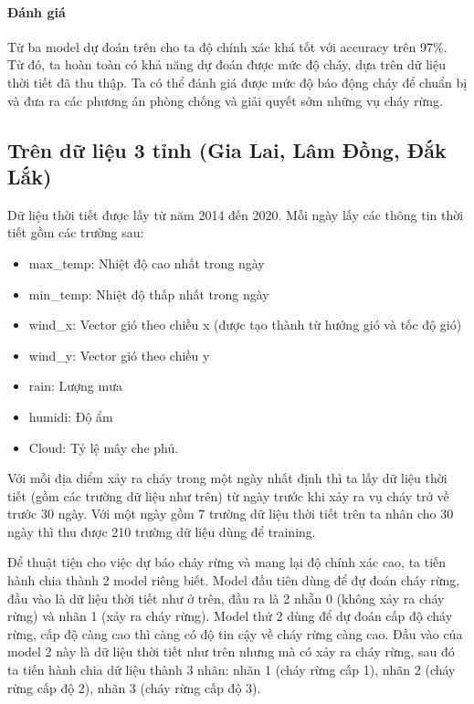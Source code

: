 \documentclass{article}
\begin{document}
\paragraph{Đánh giá}
Từ ba model dự đoán trên cho ta độ chính xác khá tốt với accuracy trên 97\%. Từ đó, ta hoàn toàn có khả năng dự đoán được mức độ cháy, dựa trên dữ liệu thời tiết đã thu thập. Ta có thể  đánh giá được mức độ báo động cháy để chuẩn bị và đưa ra các phương án phòng chống và giải quyết sớm những vụ cháy rừng.

\subsection{Trên dữ liệu 3 tỉnh (Gia Lai, Lâm Đồng, Đắk Lắk)}

Dữ liệu thời tiết được lấy từ năm 2014 đến 2020. Mỗi ngày lấy các thông tin thời tiết gồm các trường sau:

\begin{itemize}
	\item max\_temp: Nhiệt độ cao nhất trong ngày
	\item min\_temp: Nhiệt độ thấp nhất trong ngày
	\item wind\_x: Vector gió theo chiều x (được tạo thành từ hướng gió và tốc độ gió)
	\item wind\_y: Vector gió theo chiều y
	\item rain: Lượng mưa
	\item humidi: Độ ẩm
	\item Cloud: Tỷ lệ mây che phủ.
\end{itemize}

Với mỗi địa diểm xảy ra cháy trong một ngày nhất định thì ta lấy dữ liệu thời tiết (gồm các trường dữ liệu như trên) từ ngày trước khi xảy ra vụ cháy trở về trước 30 ngày. Với một ngày gồm 7 trường dữ liệu thời tiết trên ta nhân cho 30 ngày thì thu được 210 trường dữ liệu dùng để training.

Để thuật tiện cho việc dự báo cháy rừng và mang lại độ chính xác cao, ta tiến hành chia thành 2 model riêng biết. Model đầu tiên dùng để đự đoán cháy rừng, đầu vào là dữ liệu thời tiết như ở trên, đầu ra là 2 nhẵn 0 (không xảy ra cháy rừng) và nhãn 1 (xảy ra cháy rừng). Model thứ 2 dùng để dự đoán cấp độ cháy rừng, cấp độ càng cao thì càng có độ tin cậy về cháy rừng càng cao. Đầu vào của model 2 này là dữ liệu thời tiết như trên nhưng mà có xảy ra cháy rừng, sau đó ta tiến hành chia dữ liệu thành 3 nhãn: nhãn 1 (cháy rừng cấp 1), nhãn 2 (cháy rừng cấp độ 2), nhãn 3 (cháy rừng cấp độ 3).
\end{document}

